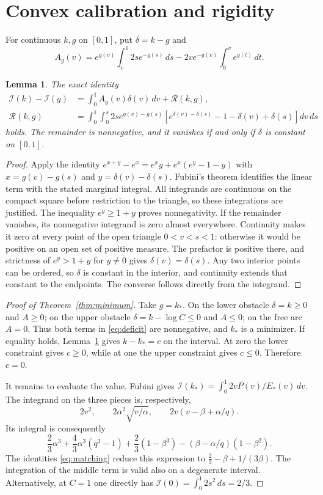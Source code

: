 \documentclass[11pt]{article}
\newtheorem{lemma}[theorem]{Lemma}
\newcommand{\I}{\mathcal I}
\begin{document}
\section{Convex calibration and rigidity}

For continuous $k,g$ on $[0,1]$, put $\delta=k-g$ and
\[
 A_g(v)=e^{g(v)}\int_v^1 2s e^{-g(s)}\,ds
       -2v e^{-g(v)}\int_0^v e^{g(t)}\,dt.
\]
\begin{lemma}\label{lem:deficit}
The exact identity
\begin{align}\label{eq:deficit}
 \I(k)-\I(g)
 &=\int_0^1 A_g(v)\delta(v)\,dv+\mathcal R(k,g),\\
 \mathcal R(k,g)
 &=\int_0^1\int_0^s 2s e^{g(v)-g(s)}
 \left[e^{\delta(v)-\delta(s)}-1-\delta(v)+\delta(s)\right]dv\,ds
 \nonumber
\end{align}
holds. The remainder is nonnegative, and it vanishes if and only if
$\delta$ is constant on $[0,1]$.
\end{lemma}

\begin{proof}
Apply the identity $e^{x+y}-e^x=e^xy+e^x(e^y-1-y)$ with
$x=g(v)-g(s)$ and $y=\delta(v)-\delta(s)$. Fubini's theorem identifies
the linear term with the stated marginal integral. All integrands are
continuous on the compact square before restriction to the triangle, so
these integrations are justified. The inequality $e^y\geq1+y$ proves
nonnegativity. If the remainder vanishes, its nonnegative integrand is
zero almost everywhere. Continuity makes it zero at every point of the
open triangle $0<v<s<1$: otherwise it would be positive on an open set
of positive measure. The prefactor is positive there, and strictness of
$e^y>1+y$ for $y\ne0$ gives $\delta(v)=\delta(s)$. Any two interior
points can be ordered, so $\delta$ is constant in the interior, and
continuity extends that constant to the endpoints. The converse follows
directly from the integrand.
\end{proof}

\begin{proof}[Proof of Theorem~\ref{thm:minimum}]
Take $g=k_*$. On the lower obstacle $\delta=k\geq0$ and $A\geq0$;
on the upper obstacle $\delta=k-\log C\leq0$ and $A\leq0$; on the
free arc $A=0$. Thus both terms in \eqref{eq:deficit} are nonnegative,
and $k_*$ is a minimizer. If equality holds, Lemma~\ref{lem:deficit}
gives $k-k_*=c$ on the interval. At zero the lower constraint gives
$c\geq0$, while at one the upper constraint gives $c\leq0$. Therefore
$c=0$.

It remains to evaluate the value. Fubini gives
$\I(k_*)=\int_0^1 2vP(v)/E_*(v)\,dv$. The integrand on the three
pieces is, respectively,
\[
 2v^2,\qquad 2\alpha^2\sqrt{v/\alpha},\qquad
 2v(v-\beta+\alpha/q).
\]
Its integral is consequently
\[
 \frac23\alpha^3+\frac43\alpha^3(q^3-1)
 +\frac23(1-\beta^3)-(\beta-\alpha/q)(1-\beta^2).
\]
The identities \eqref{eq:matching} reduce this expression to
$\frac23-\beta+1/(3\beta)$. The integration of the middle term is
valid also on a degenerate interval. Alternatively, at $C=1$ one
directly has $\I(0)=\int_0^1 2s^2\,ds=2/3$.
\end{proof}
\end{document}
